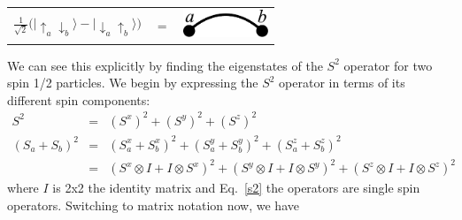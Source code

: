 \begin{center}
\begin{tabular}{ccc}
$  \frac{1}{\sqrt{2}}\big( \lvert \uparrow_a \downarrow_b \rangle - \lvert \downarrow_a \uparrow_b \rangle \big) $ & $= $
&
\includegraphics [width=1in]
{./figures/made/bond2.pdf}
\end{tabular}
\end{center}

We can see this explicitly by finding the eigenstates of the $S^2$ operator for 
two spin 1/2 particles.  We begin by expressing the $S^2$ operator in terms of its different
spin components:
\begin{eqnarray}
S^2 &=& (S^x)^2 + (S^y)^2 + (S^z)^2 \\
(S_a + S_b)^2 &=& (S^x_a+S^x_b)^2 + (S^y_a+S^y_b)^2 + (S^z_a+S^z_b)^2 \nonumber \\
			&=&(S^x\otimes I+I \otimes S^x)^2 + 
			(S^y\otimes I+I\otimes S^y)^2 + (S^z\otimes I+I\otimes S^z)^2
			\label{s2}
\end{eqnarray}
where $I$ is 2x2 the identity matrix and Eq.~\eqref{s2} the operators are single spin operators.
Switching to matrix notation now, we have
